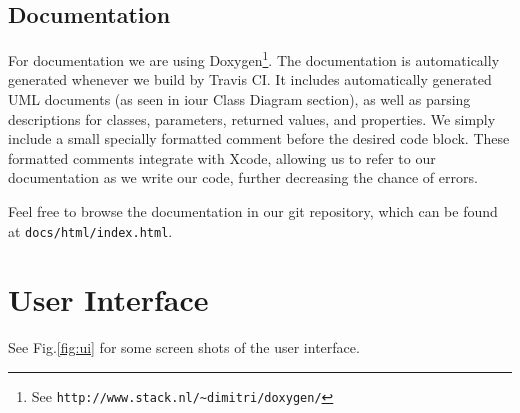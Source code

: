 \documentclass[11pt]{article}
\begin{document}
\subsection{Documentation}
For documentation we are using Doxygen\footnote{See \texttt{http://www.stack.nl/\textasciitilde dimitri/doxygen/}}. The documentation is automatically generated whenever we build by Travis CI. It includes automatically generated UML documents (as seen in iour Class Diagram section), as well as parsing descriptions for classes, parameters, returned values, and properties. We simply include a small specially formatted comment before the desired code block. These formatted comments integrate with Xcode, allowing us to refer to our documentation as we write our code, further decreasing the chance of errors. 

Feel free to browse the documentation in our git repository, which can be found at \texttt{docs/html/index.html}. 

\section{User Interface}
See Fig.\ref{fig:ui} for some screen shots of the user interface.
\end{document}
